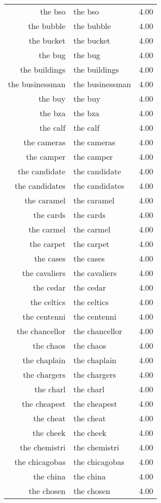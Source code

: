 \begin{table}[ht]
\begin{tabular}{rlr}
  the bso & the bso & 4.00 \\ 
  the bubble & the bubble & 4.00 \\ 
  the bucket & the bucket & 4.00 \\ 
  the bug & the bug & 4.00 \\ 
  the buildings & the buildings & 4.00 \\ 
  the businessman & the businessman & 4.00 \\ 
  the buy & the buy & 4.00 \\ 
  the bza & the bza & 4.00 \\ 
  the calf & the calf & 4.00 \\ 
  the cameras & the cameras & 4.00 \\ 
  the camper & the camper & 4.00 \\ 
  the candidate & the candidate & 4.00 \\ 
  the candidates & the candidates & 4.00 \\ 
  the caramel & the caramel & 4.00 \\ 
  the cards & the cards & 4.00 \\ 
  the carmel & the carmel & 4.00 \\ 
  the carpet & the carpet & 4.00 \\ 
  the cases & the cases & 4.00 \\ 
  the cavaliers & the cavaliers & 4.00 \\ 
  the cedar & the cedar & 4.00 \\ 
  the celtics & the celtics & 4.00 \\ 
  the centenni & the centenni & 4.00 \\ 
  the chancellor & the chancellor & 4.00 \\ 
  the chaos & the chaos & 4.00 \\ 
  the chaplain & the chaplain & 4.00 \\ 
  the chargers & the chargers & 4.00 \\ 
  the charl & the charl & 4.00 \\ 
  the cheapest & the cheapest & 4.00 \\ 
  the cheat & the cheat & 4.00 \\ 
  the cheek & the cheek & 4.00 \\ 
  the chemistri & the chemistri & 4.00 \\ 
  the chicagobas & the chicagobas & 4.00 \\ 
  the china & the china & 4.00 \\ 
  the chosen & the chosen & 4.00 \\ 

\end{tabular}
\end{table}
